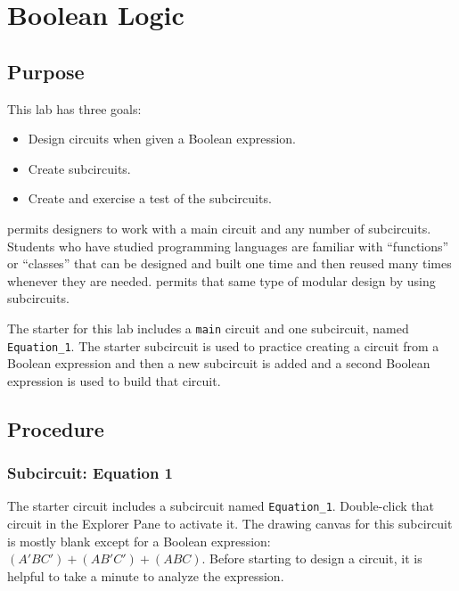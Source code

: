 \chapter{Boolean Logic}

\section{Purpose}

This lab has three goals: 

\begin{itemize}
	\item Design circuits when given a Boolean expression.
	\item Create subcircuits.
	\item Create and exercise a test of the subcircuits.
\end{itemize}

\LE permits designers to work with a main circuit and any number of subcircuits. Students who have studied programming languages are familiar with ``functions'' or ``classes'' that can be designed and built one time and then reused many times whenever they are needed. \LE permits that same type of modular design by using subcircuits. 

The \LE starter for this lab includes a \lstinline[columns=fixed]|main| circuit and one subcircuit, named \lstinline[columns=fixed]|Equation_1|. The starter subcircuit is used to practice creating a circuit from a Boolean expression and then a new subcircuit is added and a second Boolean expression is used to build that circuit.

\section{Procedure}

\subsection{Subcircuit: Equation 1}

The starter circuit includes a subcircuit named \lstinline[columns=fixed]|Equation_1|. Double-click that circuit in the Explorer Pane to activate it. The drawing canvas for this subcircuit is mostly blank except for a Boolean expression: $ (A'BC')+(AB'C')+(ABC) $. Before starting to design a circuit, it is helpful to take a minute to analyze the expression. 


